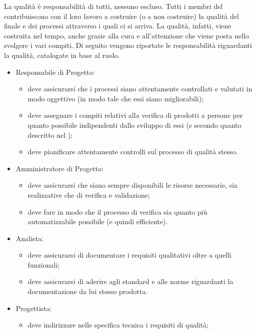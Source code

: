 		 \label{subsec:responsabilita}
			La qualità è responsabilità di tutti, nessuno escluso. Tutti i membri del  contribuiscono con il loro lavoro a costruire (o a non 
			costruire) la qualità del  finale e dei processi attraverso i quali ci si arriva. La qualità, infatti, viene costruita nel tempo, 
			anche grazie alla cura e all'attenzione che viene posta nello svolgere i vari compiti.
			Di seguito vengono riportate le responsabilità riguardanti la qualità, catalogate in base al ruolo.
			\begin{itemize}
				\item Responsabile di Progetto:
				\begin{itemize}
					\item deve assicurarsi che i processi siano attentamente controllati e valutati in modo oggettivo (in modo tale che essi siano 
					migliorabili);
					\item deve assegnare i compiti relativi alla verifica di prodotti a persone per quanto possibile indipendenti dallo sviluppo di essi 
					(e secondo quanto descritto nel );
					\item deve pianificare attentamente controlli sul processo di qualità stesso.
				\end{itemize}
				\item Amministratore di Progetto:
				\begin{itemize}
					\item deve assicurarsi che siano sempre disponibili le risorse necessarie, sia realizzative che di verifica e validazione;
					\item deve fare in modo che il processo di verifica sia quanto più automatizzabile possibile (e quindi efficiente).
				\end{itemize}
				\item Analista:
				\begin{itemize}
					\item deve assicurarsi di documentare i requisiti qualitativi oltre a quelli funzionali;
					\item deve assicurarsi di aderire agli standard e alle norme riguardanti la documentazione da lui stesso prodotta.
				\end{itemize}
				\item Progettista:
				\begin{itemize}
					\item deve indirizzare nelle specifica tecnica i requisiti di qualità;

\end{itemize}
\end{itemize}
